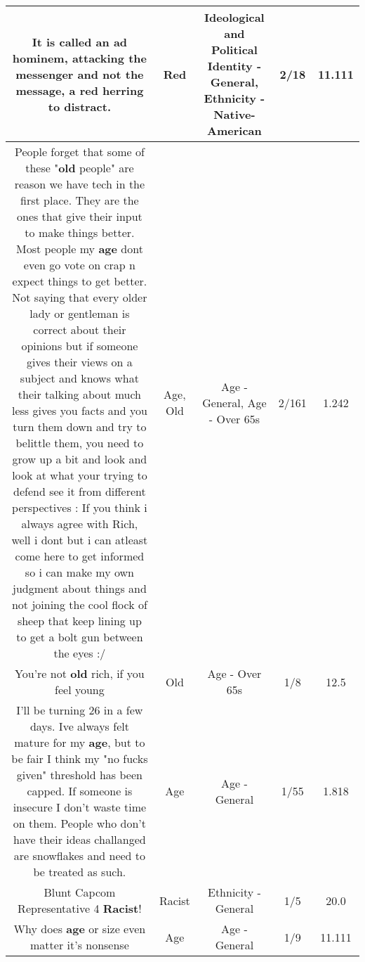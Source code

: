 \documentclass[11pt]{article}
\newlength\mylength
\begin{document}
\begin{center}
\begin{longtable}{|C{.65\mylength}|C{.30\mylength}|C{.12\mylength}|C{.12\mylength}|C{.12\mylength}|}
  \small It is called an ad hominem, attacking the messenger and not the message, a \textbf{r\textbf{ed}} herring to distract.\normalsize   & Red &  Ideological and Political Identity - General, Ethnicity - Native-American & 2/18 & 11.111 \\  \hline
  \small People forget that some of these "\textbf{old} people" are reason we have tech in the first place. They are the ones that give their input to make things better. Most people my \textbf{age} dont even go vote on crap n expect things to get better. Not saying that every older lady or gentleman is correct about their opinions but if someone gives their views on a subject and knows what their talking about much less gives you facts and you turn them down and try to belittle them, you need to grow up a bit and look and look at what your trying to defend see it from different perspectives : If you think i always agree with Rich, well i dont but i can atleast come here to get informed so i can make my own judgment about things and not joining the cool flock of sheep that keep lining up to get a bolt gun between the eyes :/\normalsize   & Age, Old & Age - General, Age - Over 65s & 2/161 & 1.242 \\  \hline
  \small You're not \textbf{old} rich, if you feel young\normalsize   & Old & Age - Over 65s & 1/8 & 12.5 \\  \hline
  \small I'll be turning 26 in a few days. Ive always felt mature for my \textbf{age}, but to be fair I think my "no fucks given" threshold has been capped. If someone is insecure I don't waste time on them. People who don't have their ideas challanged are snowflakes and need to be treated as such.\normalsize   & Age & Age - General & 1/55 & 1.818 \\  \hline
  \small Blunt Capcom Representative 4  \textbf{Racist}!\normalsize   & Racist & Ethnicity - General & 1/5 & 20.0 \\  \hline
  \small Why does \textbf{age} or size even matter it's nonsense\normalsize   & Age & Age - General & 1/9 & 11.111 \\  \hline

\end{longtable}
\end{center}
\end{document}
